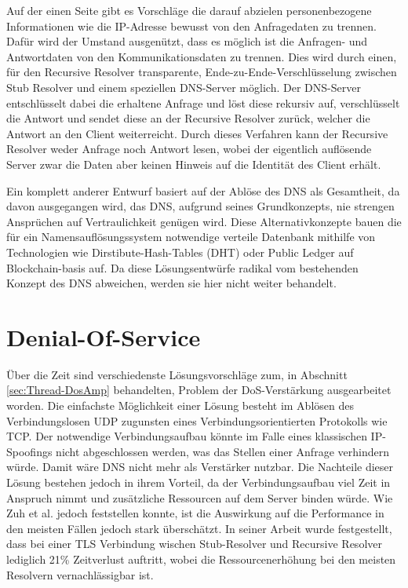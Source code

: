 Auf der einen Seite gibt es Vorschläge die darauf abzielen personenbezogene Informationen wie die IP-Adresse bewusst von den Anfragedaten zu trennen. Dafür wird der Umstand ausgenützt, dass es möglich ist die Anfragen- und Antwortdaten von den Kommunikationsdaten zu trennen. Dies wird durch einen, für den Recursive Resolver transparente, Ende-zu-Ende-Verschlüsselung zwischen Stub Resolver und einem speziellen DNS-Server möglich. Der DNS-Server entschlüsselt dabei die erhaltene Anfrage und löst diese rekursiv auf, verschlüsselt die Antwort und sendet diese an der Recursive Resolver zurück, welcher die Antwort an den Client weiterreicht. Durch dieses Verfahren kann der Recursive Resolver weder Anfrage noch Antwort lesen, wobei der eigentlich auflösende Server zwar die Daten aber keinen Hinweis auf die Identität des Client erhält.

Ein komplett anderer Entwurf basiert auf der Ablöse des DNS als Gesamtheit, da davon ausgegangen wird, das DNS, aufgrund seines Grundkonzepts, nie strengen Ansprüchen auf Vertraulichkeit genügen wird. Diese Alternativkonzepte bauen die für ein Namensauflösungssystem notwendige verteile Datenbank mithilfe von Technologien wie Dirstibute-Hash-Tables (DHT) oder Public Ledger auf Blockchain-basis auf. Da diese Lösungsentwürfe radikal vom bestehenden Konzept des DNS abweichen, werden sie hier nicht weiter behandelt.      


\section{Denial-Of-Service}

Über die Zeit sind verschiedenste Lösungsvorschläge zum, in Abschnitt \ref{sec:Thread-DosAmp} behandelten, Problem der DoS-Verstärkung ausgearbeitet worden. Die einfachste Möglichkeit einer Lösung besteht im Ablösen des Verbindungslosen UDP zugunsten eines Verbindungsorientierten Protokolls wie TCP. Der notwendige Verbindungsaufbau könnte im Falle eines klassischen IP-Spoofings nicht abgeschlossen werden, was das Stellen einer Anfrage verhindern würde. Damit wäre DNS nicht mehr als Verstärker nutzbar. Die Nachteile dieser Lösung bestehen jedoch in ihrem Vorteil, da der Verbindungsaufbau viel Zeit in Anspruch nimmt und zusätzliche Ressourcen auf dem Server binden würde. Wie Zuh et al. \cite{Zhu2015} jedoch feststellen konnte, ist die Auswirkung auf die Performance in den meisten Fällen jedoch stark überschätzt. In seiner Arbeit wurde festgestellt, dass bei einer TLS Verbindung wischen Stub-Resolver und Recursive Resolver lediglich 21\% Zeitverlust auftritt, wobei die Ressourcenerhöhung bei den meisten Resolvern vernachlässigbar ist. 

